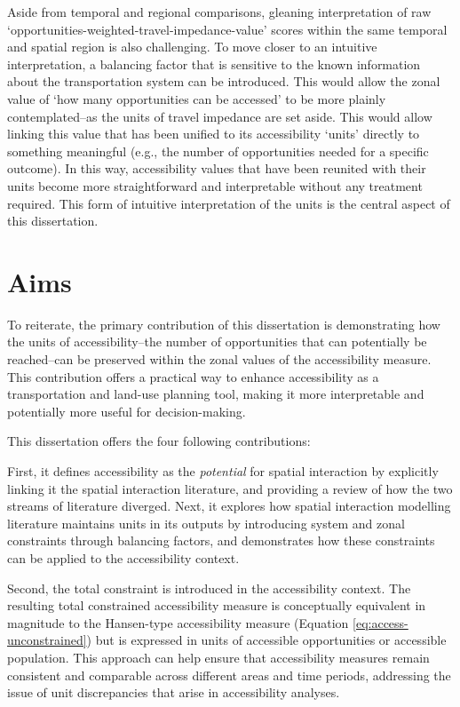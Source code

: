 \documentclass[
11pt, %
oneside, %
english, %
singlespacing, %
]{macthesis} %
\begin{document}
Aside from temporal and regional comparisons, gleaning interpretation of raw `opportunities-weighted-travel-impedance-value' scores within the same temporal and spatial region is also challenging. To move closer to an intuitive interpretation, a balancing factor that is sensitive to the known information about the transportation system can be introduced. This would allow the zonal value of `how many opportunities can be accessed' to be more plainly contemplated--as the units of travel impedance are set aside. This would allow linking this value that has been unified to its accessibility `units' directly to something meaningful (e.g., the number of opportunities needed for a specific outcome). In this way, accessibility values that have been reunited with their units become more straightforward and interpretable without any treatment required. This form of intuitive interpretation of the units is the central aspect of this dissertation.

\section{Aims}\label{aims}

To reiterate, the primary contribution of this dissertation is demonstrating how the units of accessibility--the number of opportunities that can potentially be reached--can be preserved within the zonal values of the accessibility measure. This contribution offers a practical way to enhance accessibility as a transportation and land-use planning tool, making it more interpretable and potentially more useful for decision-making.

This dissertation offers the four following contributions:

First, it defines accessibility as the \emph{potential} for spatial interaction by explicitly linking it the spatial interaction literature, and providing a review of how the two streams of literature diverged. Next, it explores how spatial interaction modelling literature maintains units in its outputs by introducing system and zonal constraints through balancing factors, and demonstrates how these constraints can be applied to the accessibility context.

Second, the total constraint is introduced in the accessibility context. The resulting total constrained accessibility measure is conceptually equivalent in magnitude to the Hansen-type accessibility measure (Equation \ref{eq:access-unconstrained}) but is expressed in units of accessible opportunities or accessible population. This approach can help ensure that accessibility measures remain consistent and comparable across different areas and time periods, addressing the issue of unit discrepancies that arise in accessibility analyses.
\end{document}
